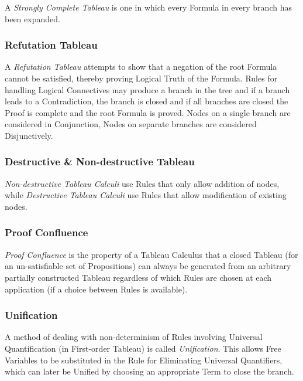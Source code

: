 A \emph{Strongly Complete Tableau} is one in which every Formula in
every branch has been expanded.



\subsubsection{Refutation Tableau}\label{sec:refutation_tableau}

A \emph{Refutation Tableau} attempts to show that a negation of the
root Formula cannot be satisfied, thereby proving Logical Truth of the
Formula. Rules for handling Logical Connectives may produce a branch
in the tree and if a branch leads to a Contradiction, the branch is
closed and if all branches are closed the Proof is complete and the
root Formula is proved. Nodes on a single branch are considered in
Conjunction, Nodes on separate branches are considered Disjunctively.



\subsubsection{Destructive \& Non-destructive Tableau}
\label{sec:destructive_tableau}

\emph{Non-destructive Tableau Calculi} use Rules that only allow
addition of nodes, while \emph{Destructive Tableau Calculi} use Rules
that allow modification of existing nodes.



\subsubsection{Proof Confluence} \label{sec:proof_confluence}

\emph{Proof Confluence} is the property of a Tableau Calculus that a
closed Tableau (for an un-satisfiable set of Propositions) can always
be generated from an arbitrary partially constructed Tableau
regardless of which Rules are chosen at each application (if a choice
between Rules is available).



\subsubsection{Unification} \label{sec:unification}

A method of dealing with non-determinism of Rules involving Universal
Quantification (in First-order Tableau) is called \emph{Unification}.
This allows Free Variables to be substituted in the Rule for
Eliminating Universal Quantifiers, which can later be Unified by
choosing an appropriate Term to close the branch.



